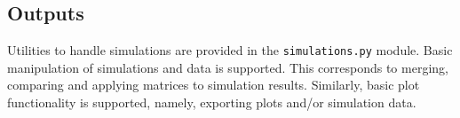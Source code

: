 \subsection{Outputs}
Utilities to handle simulations are provided in the \texttt{simulations.py} module. 
Basic manipulation of simulations and data is supported.
This corresponds to merging, comparing and applying matrices to  simulation results.
Similarly, basic plot functionality is supported, namely, exporting plots and/or simulation data.
 

